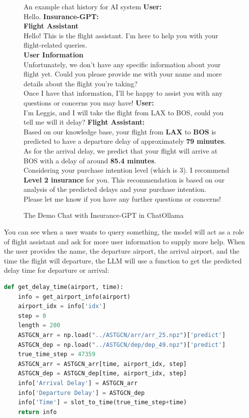 \documentclass[conference]{IEEEtran}
\begin{document}
\begin{figure}[h!]
\begin{AIbox1}{An example chat history for AI system}
{\bf User:} \\
{\small Hello.}
\tcbline
{\bf Insurance-GPT:} \\
{\small
\textbf{Flight Assistant}\\
Hello! This is the flight assistant. I'm here to help you with your flight-related queries.\\
\textbf{User Information}\\
Unfortunately, we don't have any specific information about your flight yet. Could you please provide me with your name and more details about the flight you're taking?\\
Once I have that information, I'll be happy to assist you with any questions or concerns you may have!
}
\tcbline
{\bf User:} \\
{\small I'm Leggis, and I will take the flight from LAX to BOS, could you tell me will it delay?}
\tcbline
{\bf Flight Assistant:} \\
{\small 
Based on our knowledge base, your flight from \textbf{LAX} to \textbf{BOS} is predicted to have a departure delay of approximately \textbf{79 minutes}.\\
As for the arrival delay, we predict that your flight will arrive at BOS with a delay of around \textbf{85.4 minutes}.\\
Considering your purchase intention level (which is 3). I recommend \textbf{Level 2 insurance} for you. This recommendation is based on our analysis of the predicted delays and your purchase intention.\\
Please let me know if you have any further questions or concerns!
}
\end{AIbox1} 
\caption{The Demo Chat with Insurance-GPT in ChatOllama}
\label{fig:demo}
\end{figure}

You can see when a user wants to query something, the model will act as a role of flight assistant and ask for more user information to supply more help. When the user provides the name, the departure airport, the arrival airport, and the time the flight will departure, the LLM will use a function to get the predicted delay time for departure or arrival:

\begin{lstlisting}[language=Python]
def get_delay_time(airport, time):
    info = get_airport_info(airport)
    airport_idx = info['idx']
    step = 0
    length = 200
    ASTGCN_arr = np.load("../ASTGCN/arr/arr_25.npz")['predict']
    ASTGCN_dep = np.load("../ASTGCN/dep/dep_49.npz")['predict']
    true_time_step = 47359
    ASTGCN_arr = ASTGCN_arr[time, airport_idx, step]
    ASTGCN_dep = ASTGCN_dep[time, airport_idx, step]
    info['Arrival Delay'] = ASTGCN_arr
    info['Departure Delay'] = ASTGCN_dep
    info['Time'] = slot_to_time(true_time_step+time)
    return info
\end{lstlisting}
\end{document}
